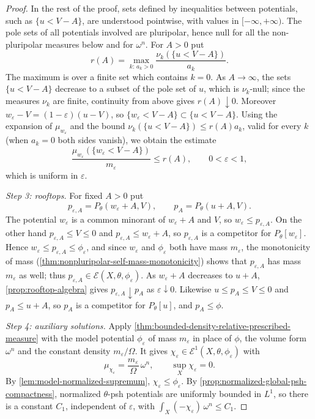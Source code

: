 \begin{proof}
In the rest of the proof, sets defined by inequalities between potentials, such as $\{u<V-A\}$, are understood pointwise, with values in $[-\infty,+\infty)$. The pole sets of all potentials involved are pluripolar, hence null for all the non-pluripolar measures below and for $\omega^n$. For $A>0$ put
\[
 r(A)=\max_{k:\,a_k>0}\frac{\nu_k(\{u<V-A\})}{a_k}.
\]
The maximum is over a finite set which contains $k=0$. As $A\to\infty$, the sets $\{u<V-A\}$ decrease to a subset of the pole set of $u$, which is $\nu_k$-null; since the measures $\nu_k$ are finite, continuity from above gives $r(A)\downarrow0$. Moreover $w_\varepsilon-V=(1-\varepsilon)(u-V)$, so $\{w_\varepsilon<V-A\}\subset\{u<V-A\}$. Using the expansion of $\mu_{w_\varepsilon}$ and the bound $\nu_k(\{u<V-A\})\leq r(A)a_k$, valid for every $k$ (when $a_k=0$ both sides vanish), we obtain the estimate
\begin{equation}\label{eq:normalized-singularity-tail}
 \frac{\mu_{w_\varepsilon}(\{w_\varepsilon<V-A\})}{m_\varepsilon}
                  \leq r(A),\qquad 0<\varepsilon<1,
\end{equation}
which is uniform in $\varepsilon$.

\emph{Step 3: rooftops.} For fixed $A>0$ put
\[
 p_{\varepsilon,A}=P_\theta(w_\varepsilon+A,V),
 \qquad p_A=P_\theta(u+A,V).
\]
The potential $w_\varepsilon$ is a common minorant of $w_\varepsilon+A$ and $V$, so $w_\varepsilon\leq p_{\varepsilon,A}$. On the other hand $p_{\varepsilon,A}\leq V\leq0$ and $p_{\varepsilon,A}\leq w_\varepsilon+A$, so $p_{\varepsilon,A}$ is a competitor for $P_\theta[w_\varepsilon]$. Hence $w_\varepsilon\leq p_{\varepsilon,A}\leq\phi_\varepsilon$, and since $w_\varepsilon$ and $\phi_\varepsilon$ both have mass $m_\varepsilon$, the monotonicity of mass (\cref{thm:nonpluripolar-self-mass-monotonicity}) shows that $p_{\varepsilon,A}$ has mass $m_\varepsilon$ as well; thus $p_{\varepsilon,A}\in\mathcal E(X,\theta,\phi_\varepsilon)$. As $w_\varepsilon+A$ decreases to $u+A$, \cref{prop:rooftop-algebra} gives $p_{\varepsilon,A}\downarrow p_A$ as $\varepsilon\downarrow0$. Likewise $u\leq p_A\leq V\leq0$ and $p_A\leq u+A$, so $p_A$ is a competitor for $P_\theta[u]$, and $p_A\leq\phi$.

\emph{Step 4: auxiliary solutions.} Apply \cref{thm:bounded-density-relative-prescribed-measure} with the model potential $\phi_\varepsilon$ of mass $m_\varepsilon$ in place of $\phi$, the volume form $\omega^n$ and the constant density $m_\varepsilon/\Omega$. It gives $\chi_\varepsilon\in\mathcal E^1(X,\theta,\phi_\varepsilon)$ with
\[
 \mu_{\chi_\varepsilon}=\frac{m_\varepsilon}{\Omega}\,\omega^n,
 \qquad \sup_X\chi_\varepsilon=0.
\]
By \cref{lem:model-normalized-supremum}, $\chi_\varepsilon\leq\phi_\varepsilon$. By \cref{prop:normalized-global-psh-compactness}, normalized $\theta$-psh potentials are uniformly bounded in $L^1$, so there is a constant $C_1$, independent of $\varepsilon$, with $\int_X(-\chi_\varepsilon)\,\omega^n\leq C_1$.


\end{proof}
